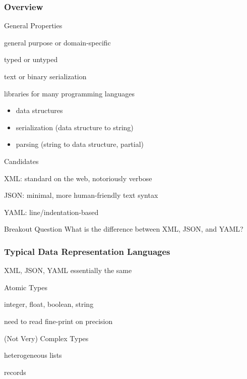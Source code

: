 \begin{frame}\frametitle{Overview}
\begin{blockitems}{General Properties}
 \item general purpose or domain-specific
 \item typed or untyped
 \item text or binary serialization
 \item libraries for many programming languages
  \begin{itemize}
  \item data structures
  \item serialization (data structure to string)
  \item parsing (string to data structure, partial)
  \end{itemize}
\end{blockitems}

\begin{blockitems}{Candidates}
 \item XML: standard on the web, notoriously verbose
 \item JSON: minimal, more human-friendly text syntax
 \item YAML: line/indentation-based
\end{blockitems}
\end{frame}

\begin{frame}{Breakout Question}
What is the difference between XML, JSON, and YAML?
\end{frame}

\begin{frame}\frametitle{Typical Data Representation Languages}
XML, JSON, YAML essentially the same

\begin{blockitems}{Atomic Types}
 \item integer, float, boolean, string
 \item need to read fine-print on precision
\end{blockitems}
 
\begin{blockitems}{(Not Very) Complex Types}
 \item heterogeneous lists
 \item records
\end{blockitems}
\end{frame}

